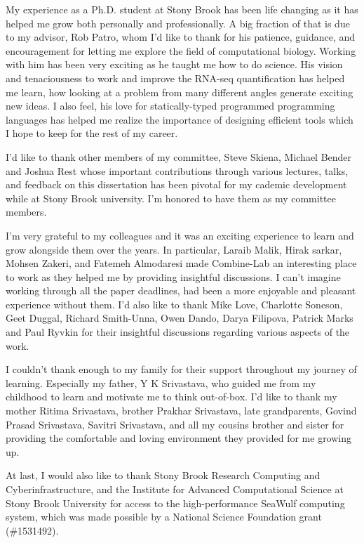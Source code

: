 \documentclass[
12pt, %
oneside, %
english, %
singlespacing, %
liststotoc, %
parskip, %
headsepline, %
]{main} %
\begin{document}
\begin{acknowledgements}
\addchaptertocentry{\acknowledgementname} %

My experience as a Ph.D. student at Stony Brook has been life changing as it has helped me 
grow both personally and professionally. A big fraction of that is due to my advisor, 
Rob Patro, whom I'd like to thank for his patience, guidance, and encouragement for letting 
me explore the field of computational biology.
Working with him has been very exciting as he taught me how to do science. His vision 
and tenaciousness to work and improve the RNA-seq quantification has helped me learn, 
how looking at a problem from many different angles generate exciting new ideas. I also 
feel, his love for statically-typed programmed programming languages has helped me realize 
the importance of designing efficient tools which I hope to keep for the rest of my career.

I'd like to thank other members of my committee, Steve Skiena, Michael Bender and Joshua Rest whose 
important contributions through various lectures, talks, and feedback on this dissertation has 
been pivotal for my cademic development while at Stony Brook university. I'm honored to 
have them as my committee members.

I'm very grateful to my colleagues and it was an exciting experience to learn and grow
alongside them over the years. In particular, Laraib Malik, Hirak sarkar, Mohsen Zakeri, and 
Fatemeh Almodaresi made Combine-Lab an interesting place to work as they helped me by 
providing insightful discussions. I can't imagine working through all the paper deadlines,
had been a more enjoyable and pleasant experience without them. I'd also like to thank Mike Love, 
Charlotte Soneson, Geet Duggal, Richard Smith-Unna, Owen Dando, Darya Filipova, Patrick Marks 
and Paul Ryvkin for their insightful discussions regarding various aspects of the work.

I couldn't thank enough to my family for their support throughout my journey of learning. 
Especially my father, Y K Srivastava, who guided me from my childhood to learn and motivate me 
to think out-of-box. I'd like to thank my mother Ritima Srivastava, brother Prakhar Srivastava,
late grandparents, Govind Prasad Srivastava, Savitri Srivastava, and all my cousins brother and
sister for providing the comfortable and loving environment they provided for me growing up. 

At last, I would also like to thank Stony Brook Research Computing and 
Cyberinfrastructure, and the Institute for Advanced Computational Science at Stony Brook 
University for access to the high-performance SeaWulf computing system, which was made 
possible by a National Science Foundation grant (\#1531492).
\end{acknowledgements}
\end{document}
